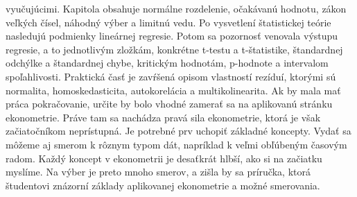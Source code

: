 \documentclass[]{tukediphc}
\begin{document}
vyučujúcimi. Kapitola obsahuje normálne rozdelenie, očakávanú hodnotu, zákon veľkých čísel, náhodný výber a limitnú vedu. Po vysvetlení štatistickej teórie nasledujú podmienky lineárnej regresie. Potom sa pozornosť venovala výstupu regresie, a to jednotlivým zložkám, konkrétne t-testu a t-štatistike, štandardnej odchýlke a štandardnej chybe, kritickým hodnotám, p-hodnote a intervalom spoľahlivosti. Praktická časť je zavŕšená opisom vlastností rezíduí, ktorými sú normalita, homoskedasticita, autokorelácia a multikolinearita. Ak by mala mať práca pokračovanie, určite by bolo vhodné zamerať sa na aplikovanú stránku ekonometrie. Práve tam sa nachádza pravá sila ekonometrie, ktorá je však začiatočníkom neprístupná. Je potrebné prv uchopiť základné koncepty. Vydať sa môžeme aj smerom k rôznym typom dát, napríklad k veľmi obľúbeným časovým radom. Každý koncept v ekonometrii je desaťkrát hlbší, ako si na začiatku myslíme. Na výber je preto mnoho smerov, a zišla by sa príručka, ktorá študentovi znázorní základy aplikovanej ekonometrie a možné smerovania.



%

%

%

%


\newpage
{}
\protect\label{page:posledna}
\end{document}
